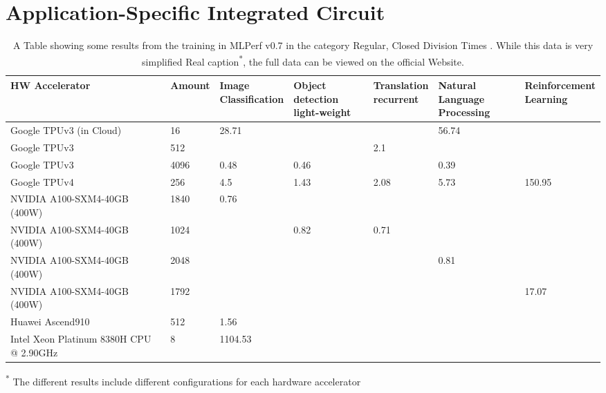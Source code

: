 \documentclass[conference]{IEEEtran}
\begin{document}
	\section{Application-Specific Integrated Circuit}
	\begin{table}[!b]
		\renewcommand{\arraystretch}{1.3}
		\centering
		\caption{A Table showing some results from the training in MLPerf v0.7 in the category Regular, Closed Division Times \cite{mlperfresults}. While this data is very simplified Real caption\textsuperscript{*}, the full data can be viewed on the official Website.}
		\begin{tabular}{lllllll}
			\toprule
			\bfseries HW Accelerator                            & \bfseries Amount & \bfseries \thead[l]{Image \\ Classification}       & \bfseries \thead[l]{Object detection \\ light-weight}    & \bfseries \thead[l]{Translation \\ recurrent}    & \bfseries \thead[l]{Natural Language \\ Processing}     & \bfseries \thead[l]{Reinforcement \\ Learning}      \\
			\midrule
			Google TPUv3 (in Cloud)                   & 16     & 28.71   &      &      & 56.74 &        \\
			Google TPUv3                              & 512    &         &      & 2.1  &       &        \\
			Google TPUv3                              & 4096   & 0.48    & 0.46 &      & 0.39  &        \\
			Google TPUv4                              & 256    & 4.5     & 1.43 & 2.08 & 5.73  & 150.95 \\
			NVIDIA   A100-SXM4-40GB (400W)            & 1840   & 0.76    &      &      &       &        \\
			NVIDIA   A100-SXM4-40GB (400W)            & 1024   &         & 0.82 & 0.71 &       &        \\
			NVIDIA   A100-SXM4-40GB (400W)            & 2048   &         &      &      & 0.81  &        \\
			NVIDIA   A100-SXM4-40GB (400W)            & 1792   &         &      &      &       & 17.07  \\
			Huawei Ascend910                          & 512    & 1.56    &      &      &       &        \\
			Intel   Xeon Platinum 8380H CPU @ 2.90GHz & 8      & 1104.53 &      &      &       &		\\
			\bottomrule                              
		\end{tabular}
		\rule{0pt}{3ex} 
		\small\textsuperscript{*} The different results include different configurations for each hardware accelerator
		\label{table:mlperf}
	\end{table}
	
\end{document}
